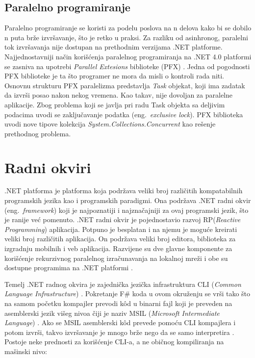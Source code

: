 \documentclass[a4paper]{article}
\begin{document}
\subsection{Paralelno programiranje}

Paralelno programiranje se koristi za podelu poslova na n delova kako bi se dobilo n puta brže izvršavanje, što je retko u praksi. Za razliku od asinhronog, paralelni tok izvršavanja nije dostupan na prethodnim verzijama .NET platforme. Najjednostavniji način korišćenja paralelnog programiranja na .NET 4.0 platformi se zasniva na upotrebi {\em Parallel Extesions} biblioteke (PFX) \cite{progFs}. Jedna od pogodnosti PFX biblioteke je ta što programer ne mora da misli o kontroli rada niti.  Osnovnu strukturu PFX paralelizma predstavlja {\em Task} objekat, koji ima zadatak da izvrši posao nakon nekog vremena. Kao takav, nije dovoljan za paralelne aplikacije. Zbog problema koji se javlja pri radu Task objekta sa deljivim podacima uvodi se zaključavanje podatka (eng.~{\em exclusive lock}). PFX biblioteka uvodi nove tipove kolekcija {\em System.Collections.Concurrent} \cite{sysCC} kao rešenje prethodnog problema.  


\section{Radni okviri}
\label{sec:radni_okviri}

.NET platforma je platforma koja podržava veliki broj različitih kompatabilnih programskih jezika kao i programskih paradigmi. Ona  podržava .NET radni okvir (eng.~{\em framework}) koji je najpoznatiji i najznačajniji za ovaj programski jezik, što je ranije već pomenuto. .NET radni okvir je pojednostavio razvoj RP({\em Reactive Programming}) \cite{RPapp} aplikacija. Potpuno je besplatan i na njemu je moguće kreirati veliki broj različitih aplikacija. On podržava veliki broj editora, biblioteka za izgradnju mobilnih i veb aplikacija. Razvijene su dve glavne komponente za korišćenje rekurzivnog paralelnog izračunavanja na lokalnoj mreži i obe su dostupne programima na .NET platformi \cite{ppNETframework}. 

Temelj .NET radnog okvira je zajednička jezička infrastruktura CLI ({\em Common Language Infrastructure}) \cite{cli}. Pokretanje F\# koda u ovom okruženju se vrši tako što na samom početku kompajler prevodi kôd u binarni fajl koji je preveden na asemblerski jezik višeg nivoa čiji je naziv MSIL ({\em Microsoft Intermediate Language}) \cite{msil}. Ako se MSIL asemblerski kôd prevede pomoću CLI kompajlera i potom izvrši, takvo izvršavanje je mnogo brže nego da se samo interpretira \cite{progFs}.
Postoje neke prednosti za korišćenje CLI-a, a ne običnog kompiliranja na mašinski nivo:	\\
\end{document}
